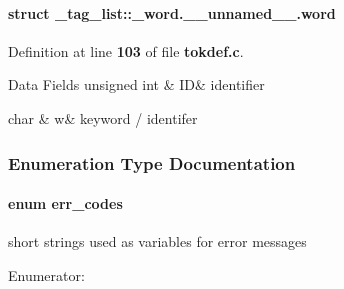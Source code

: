 \paragraph{struct \-\_\-tag\-\_\-list\-:\-:\-\_\-word.\-\_\-\-\_\-unnamed\-\_\-\-\_\-.\-word}


\-Definition at line {\bf 103} of file {\bf tokdef.\-c}.

\begin{DoxyFields}{\-Data Fields}
unsigned int\label{tokdef_8c_ab718adec73e04ce3ec720dd11a06a308}
&
\-I\-D&
identifier \\
\hline

char\label{tokdef_8c_a4140654ec46bd61087726571a573fe17}
&
w&
keyword / identifer \\
\hline

\end{DoxyFields}


\subsubsection{\-Enumeration \-Type \-Documentation}
\paragraph[{err\-\_\-codes}]{\setlength{\rightskip}{0pt plus 5cm}enum {\bf err\-\_\-codes}}\label{tokdef_8c_ad7109e2dccd18353c3bdd5f55ad94b55}
short strings used as variables for error messages \begin{Desc}
\item[\-Enumerator\-: ]\par
\begin{description}
\item[{\em 
\-N\-U\-L\-L\-\_\-\-P\-O\-I\-N\-T\-E\-R\label{tokdef_8c_ad7109e2dccd18353c3bdd5f55ad94b55a4fb873dc451927ef6a70af3a1e7f08bd}
}]\item[{\em 
\-E\-R\-R\-\_\-\-M\-E\-M\-O\-R\-Y\label{tokdef_8c_ad7109e2dccd18353c3bdd5f55ad94b55afb88c5fa6e7d51074ec36bd4578e03a0}
}]\item[{\em 
\-E\-M\-P\-T\-Y\-\_\-\-L\-I\-S\-T\label{tokdef_8c_ad7109e2dccd18353c3bdd5f55ad94b55a60202b752d64be3e9634f160ce5dca7d}
}]\end{description}
\end{Desc}



